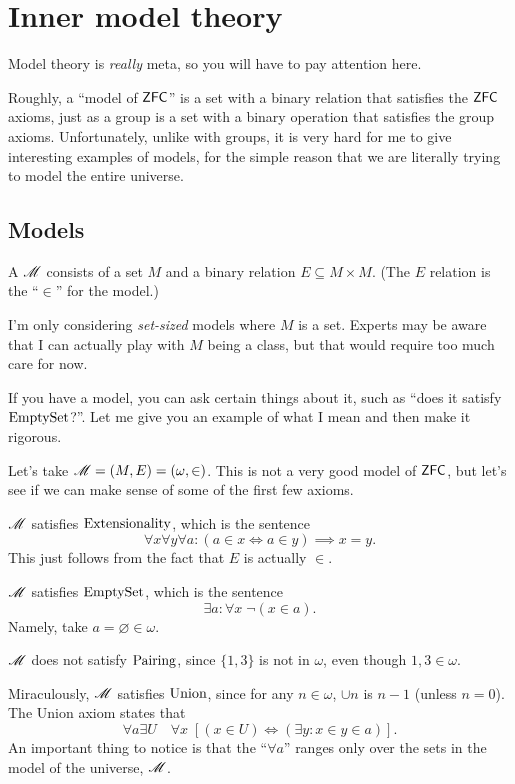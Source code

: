 \chapter{Inner model theory}
\label{ch:inner_model_theory}
Model theory is \emph{really} meta, so you will have to pay attention here.

Roughly, a ``model of $\mathsf{ZFC}$'' is a set with a binary relation that satisfies the $\mathsf{ZFC}$ axioms,
just as a group is a set with a binary operation that satisfies the group axioms.
Unfortunately, unlike with groups, it is very hard for me to give interesting examples of models,
for the simple reason that we are literally trying to model the entire universe.

\section{Models}
\begin{definition}
	A  $\mathscr M$ consists of a set $M$ and a
	binary relation $E \subseteq M \times M$.
	(The $E$ relation is the ``$\in$'' for the model.)
\end{definition}
\begin{remark}
	I'm only considering \emph{set-sized} models where $M$ is a set.
	Experts may be aware that I can actually play with $M$ being a class,
	but that would require too much care for now.
\end{remark}
If you have a model, you can ask certain things about it,
such as ``does it satisfy $\mathrm{EmptySet}$?''.
Let me give you an example of what I mean and then make it rigorous.
\begin{example}
	Let's take $\mathscr M = (M,E) = \left( \omega, \in \right)$.
	This is not a very good model of $\mathsf{ZFC}$, but let's see if we can
	make sense of some of the first few axioms.
	\begin{enumerate}[(a)]
		\ii $\mathscr M$ satisfies $\mathrm{Extensionality}$, which is the sentence
		\[ \forall x \forall y \forall a :
			\left( a \in x \iff a \in y \right) \implies x = y. \]
		This just follows from the fact that $E$ is actually $\in$.

		\ii $\mathscr M$ satisfies $\mathrm{EmptySet}$, which is the sentence
		\[ \exists a : \forall x \; \neg (x \in a). \]
		Namely, take $a = \varnothing \in \omega$.

		\ii $\mathscr M$ does not satisfy $\mathrm{Pairing}$, since $\{1,3\}$ is not in $\omega$,
		even though $1, 3 \in \omega$.

		\ii Miraculously, $\mathscr M$ satisfies $\mathrm{Union}$, since for any $n \in \omega$,
		$\cup n$ is $n-1$ (unless $n=0$).
		The Union axiom states that
		\[ \forall a \exists U \quad \forall x \;
		\left[ (x \in U) \iff (\exists y : x \in y \in a) \right]. \]
		An important thing to notice is that the ``$\forall a$'' ranges only over
		the sets in the model of the universe, $\mathscr M$.
	\end{enumerate}
\end{example}
